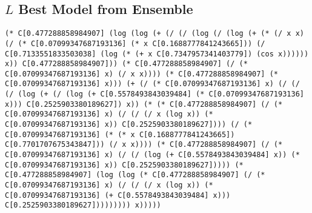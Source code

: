\documentclass[12pt, letterpaper]{article}
\begin{document}
\newpage 

\begin{appendices}
\appendix
\section{$L$ Best Model from Ensemble}
\label{appendix-a}
\begin{lstlisting}
(* C[0.477288858984907] (log (log (+ (/ (/ (log (/ (log (+ (* (/ x x) (/ (* C[0.07099347687193136] (* x C[0.1688777841243665])) (/ C[0.7133551833503038] (log (* (+ x C[0.7347957341403779]) (cos x)))))) x)) C[0.477288858984907])) (* C[0.477288858984907] (/ (* C[0.07099347687193136] x) (/ x x)))) (* C[0.477288858984907] (* C[0.07099347687193136] x))) (+ (/ (* C[0.07099347687193136] x) (/ (/ (/ (log (+ (/ (log (+ C[0.5578493843039484] (* C[0.07099347687193136] x))) C[0.2525903380189627]) x)) (* (* C[0.477288858984907] (/ (* C[0.07099347687193136] x) (/ (/ (/ x (log x)) (* C[0.07099347687193136] x)) C[0.2525903380189627]))) (/ (* C[0.07099347687193136] (* (* x C[0.1688777841243665]) C[0.7701707675343847])) (/ x x)))) (* C[0.477288858984907] (/ (* C[0.07099347687193136] x) (/ (/ (log (+ C[0.5578493843039484] x)) (* C[0.07099347687193136] x)) C[0.2525903380189627])))) (* C[0.477288858984907] (log (log (* C[0.477288858984907] (/ (* C[0.07099347687193136] x) (/ (/ (/ x (log x)) (* C[0.07099347687193136] (+ C[0.5578493843039484] x))) C[0.2525903380189627])))))))) x)))))
\end{lstlisting}


\end{appendices}
\end{document}
